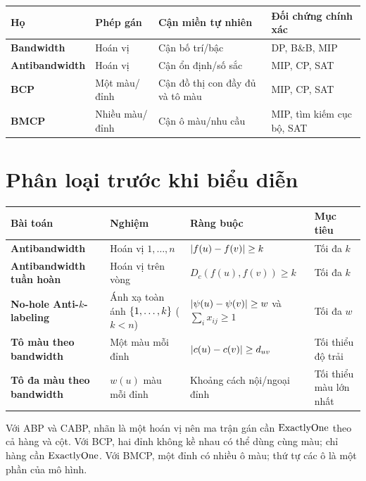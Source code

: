 \begin{center}
\label{tab:distance-families}
\begin{tabularx}{\textwidth}{@{}>{\bfseries\sffamily}p{}YYY@{}}
\toprule
Họ & Phép gán & Cận miền tự nhiên & Đối chứng chính xác\\
\midrule
Bandwidth & Hoán vị & Cận bố trí/bậc & DP, B\&B, MIP\\
Antibandwidth & Hoán vị & Cận ổn định/số sắc & MIP, CP, SAT\\
BCP & Một màu/đỉnh & Cận đồ thị con đầy đủ và tô màu & MIP, CP, SAT\\
BMCP & Nhiều màu/đỉnh & Cận ô màu/nhu cầu & MIP, tìm kiếm cục bộ, SAT\\
\bottomrule
\end{tabularx}
\end{center}

\section{Phân loại trước khi biểu diễn}

\begin{center}
\label{tab:distance-semantics}
\begin{tabularx}{\textwidth}{@{}>{\bfseries\sffamily}p{}YYY@{}}
\toprule
Bài toán & Nghiệm & Ràng buộc & Mục tiêu\\
\midrule
Antibandwidth & Hoán vị \(1,\ldots,n\) &
\(\lvert f(u)-f(v)\rvert\ge k\) & Tối đa \(k\)\\
Antibandwidth tuần hoàn & Hoán vị trên vòng &
\(D_c(f(u),f(v))\ge k\) & Tối đa \(k\)\\
No-hole Anti-\(k\)-labeling & Ánh xạ toàn ánh \(\left\{1,\ldots,k\right\}\) (\(k<n\)) &
\(\lvert \psi(u)-\psi(v)\rvert\ge w\) và \(\sum_i x_{ij}\ge 1\) & Tối đa \(w\)\\
Tô màu theo bandwidth & Một màu mỗi đỉnh &
\(\lvert c(u)-c(v)\rvert\ge d_{uv}\) & Tối thiểu độ trải\\
Tô đa màu theo bandwidth & \(w(u)\) màu mỗi đỉnh &
Khoảng cách nội/ngoại đỉnh & Tối thiểu màu lớn nhất\\
\bottomrule
\end{tabularx}
\end{center}

Với ABP và CABP, nhãn là một hoán vị nên ma trận gán cần
\(\operatorname{ExactlyOne}\) theo cả hàng và cột. Với BCP, hai đỉnh không kề nhau có thể
dùng cùng màu; chỉ hàng cần \(\operatorname{ExactlyOne}\). Với BMCP, một đỉnh có nhiều ô
màu; thứ tự các ô là một phần của mô hình.


